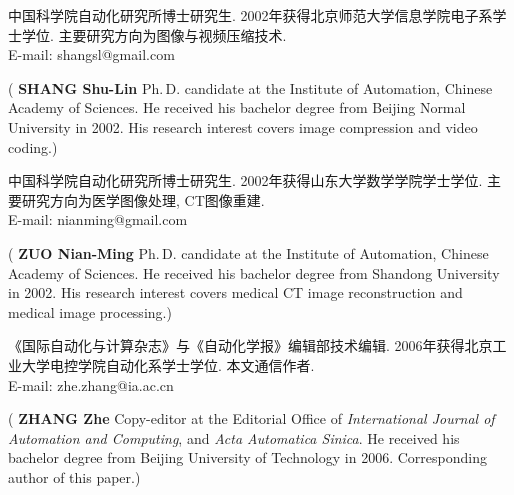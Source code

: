 \documentclass[fontset=mac]{aas}
\begin{document}
\begin{biography}
\quad
中国科学院自动化研究所博士研究生.
2002年获得北京师范大学信息学院电子系学士学位.
主要研究方向为图像与视频压缩技术.\\E-mail: shangsl@gmail.com

\noindent({\bf
SHANG Shu-Lin
}\quad
Ph.\,D. candidate at the
Institute of Automation, Chinese Academy of Sciences. He received
his bachelor degree from Beijing Normal University in 2002. His research
interest covers image compression and video coding.)
\end{biography}

\begin{biography}
\quad
中国科学院自动化研究所博士研究生.
2002年获得山东大学数学学院学士学位.
主要研究方向为医学图像处理, CT图像重建.\\E-mail: nianming@gmail.com

\noindent({\bf
ZUO Nian-Ming
}\quad
Ph.\,D. candidate at the
Institute of Automation, Chinese Academy of Sciences. He received
his bachelor degree from Shandong University in 2002. His research
interest covers medical CT image reconstruction and medical image
processing.)
\end{biography}

\begin{biography}[zz.eps]
\quad
《国际自动化与计算杂志》与《自动化学报》编辑部技术编辑. 2006年获得北京工业大学电控学院自动化系学士学位.
本文通信作者.\\E-mail: zhe.zhang@ia.ac.cn

\noindent({\bf
ZHANG Zhe
}\quad
Copy-editor at the Editorial Office of
{\sl International Journal of Automation and Computing}, and {\sl
Acta Automatica Sinica}. He received his bachelor degree from Beijing
University of Technology in 2006. Corresponding author of this paper.)
\end{biography}
\end{document}
